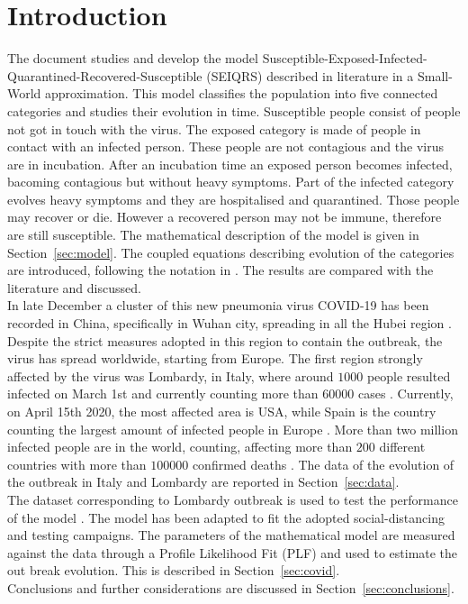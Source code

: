 \section{Introduction}
The document studies and develop the model Susceptible-Exposed-Infected-Quarantined-Recovered-Susceptible (SEIQRS) described in literature \cite{MingLiu} in a Small-World approximation. This model classifies the population into five connected categories and studies their evolution in time. Susceptible people consist of people not got in touch with the virus. The exposed category is made of people in contact with an infected person. These people are not contagious and the virus are in incubation. After an incubation time an exposed person becomes infected, bacoming contagious but without heavy symptoms. Part of the infected category evolves heavy symptoms and they are hospitalised and quarantined. Those people may recover or die. However a recovered person may not be immune, therefore are still susceptible. The mathematical description of the model is given in Section~\ref{sec:model}. The coupled equations describing evolution of the categories are introduced, following the notation in \cite{MingLiu}. The results are compared with the literature and discussed. \\

In late December a cluster of this new pneumonia virus COVID-19 has been recorded in China, specifically in Wuhan city, spreading in all the Hubei region \cite{COVID-Clinical}. Despite the strict measures adopted in this region to contain the outbreak, the virus has spread worldwide, starting from Europe. The first region strongly affected by the virus was Lombardy, in Italy, where around $1000$ people resulted infected on March 1st and currently counting more than $60000$ cases \cite{Lab24}. Currently, on April 15th 2020, the most affected area is USA, while Spain is the country counting the largest amount of infected people in Europe \cite{WHO}. More than two million infected people are in the world, counting, affecting more than $200$ different countries with more than $100000$ confirmed deaths \cite{WHO}. The data of the evolution of the outbreak in Italy and Lombardy are reported in Section~\ref{sec:data}.\\

The dataset corresponding to Lombardy outbreak is used to test the performance of the model \cite{Lab24}. The model has been adapted to fit the adopted social-distancing and testing campaigns. The parameters of the mathematical model are measured against the data through a Profile Likelihood Fit (PLF) and used to estimate the out break evolution. This is described in Section~\ref{sec:covid}.\\

Conclusions and further considerations are discussed in Section~\ref{sec:conclusions}.

